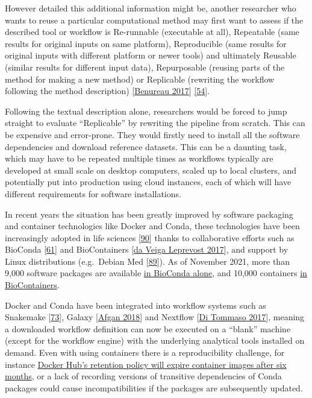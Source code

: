 However detailed this additional information might be, another
researcher who wants to reuse a particular computational method may
first want to assess if the described tool or workflow is Re-runnable
(executable at all), Repeatable (same results for original inputs on
same platform), Reproducible (same results for original inputs with
different platform or newer tools) and ultimately Reusable (similar
results for different input data), Repurposable (reusing parts of the
method for making a new method) or Replicable (rewriting the workflow
following the method description)
{[}\href{https://doi.org/10.3389/fninf.2017.00069}{Benureau 2017}{]}
\href{http://repscience2016.research-infrastructures.eu/img/CaroleGoble-ReproScience2016v2.pdf}{{[}54{]}}.

Following the textual description alone, researchers would be forced to
jump straight to evaluate ``Replicable'' by rewriting the pipeline from
scratch. This can be expensive and error-prone. They would firstly need
to install all the software dependencies and download reference
datasets. This can be a daunting task, which may have to be repeated
multiple times as workflows typically are developed at small scale on
desktop computers, scaled up to local clusters, and potentially put into
production using cloud instances, each of which will have different
requirements for software installations.

In recent years the situation has been greatly improved by software
packaging and container technologies like Docker and Conda, these
technologies have been increasingly adopted in life sciences
{[}\href{https://doi.org/10.1007/s41019-017-0050-4}{90}{]} thanks to
collaborative efforts such as BioConda
{[}\href{https://doi.org/10.1038/s41592-018-0046-7}{61}{]} and
BioContainers
{[}\href{https://doi.org/10.1093/bioinformatics/btx192}{da Veiga Leprevost 2017}{]}, and
support by Linux distributions (e.g.~Debian Med
{[}\href{https://doi.org/10.1186/1471-2105-11-S12-S5}{89}{]}). As of
November 2021, more than 9,000 software packages are available
\href{https://anaconda.org/bioconda/}{in BioConda alone}, and 10,000
containers \href{https://biocontainers.pro/\#/registry}{in
BioContainers}.

Docker and Conda have been integrated into workflow systems such as
Snakemake
{[}\href{https://doi.org/10.1093/bioinformatics/bts480}{73}{]}, Galaxy
{[}\href{https://doi.org/10.1093/nar/gky379}{Afgan 2018}{]} and Nextflow
{[}\href{https://doi.org/10.1038/nbt.3820}{Di Tommaso 2017}{]}, meaning a downloaded
workflow definition can now be executed on a ``blank'' machine (except
for the workflow engine) with the underlying analytical tools installed
on demand. Even with using containers there is a reproducibility
challenge, for instance
\href{https://www.docker.com/blog/docker-hub-image-retention-policy-delayed-and-subscription-updates/}{Docker
Hub's retention policy will expire container images after six months},
or a lack of recording versions of transitive dependencies of Conda
packages could cause incompatibilities if the packages are subsequently
updated.

